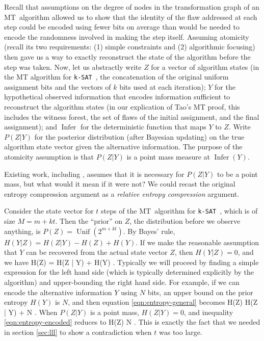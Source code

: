 \documentclass{article}
\newcommand{\ksat}{\texttt{k-SAT}~}
\newcommand{\mt}{MT~}
\def\seqn#1\eeqn{\begin{align}#1\end{align}}
\begin{document}
Recall that assumptions on the degree of nodes in the transformation graph of an \mt algorithm allowed us to show that the identity of the flaw addressed at each step could be encoded using fewer bits on average than would be needed to encode the randomness involved in making the step itself.  Assuming atomicity (recall its two requirements: (1) simple constraints and (2) algorithmic focusing) then gave us a way to exactly reconstruct the state of the algorithm before the step was taken.  Now, let us abstractly write $Z$ for a vector of algorithm states (in the MT algorithm for \ksat, the concatenation of the original uniform assignment bits and the vectors of $k$ bits used at each iteration); $Y$ for the hypothetical observed information that encodes information sufficient to reconstruct the algorithm states (in our explication of Tao's MT proof, this includes the witness forest, the set of flaws of the initial assignment, and the final assignment); and $\operatorname{Infer}$ for the deterministic function that maps $Y$ to $Z$.  Write $P(Z | Y)$ for the posterior distribution (after Bayesian updating) on the true algorithm state vector given the alternative information.  The purpose of the atomicity assumption is that $P(Z | Y)$ is a point mass measure at $\operatorname{Infer}(Y)$.

Existing work, including \cite{achlioptas2014random}, assumes that it is necessary for $P(Z | Y)$ to be a point mass, but what would it mean if it were not?  We could recast the original entropy compression argument as a \emph{relative entropy compression} argument.

Consider the state vector for $t$ steps of the \mt algorithm for \ksat, which is of size $M = m + kt$.  Then the ``prior'' on $Z$, the distribution before we observe anything, is $P(Z) = \operatorname{Unif}(2^{m+kt})$.  By Bayes' rule, $H(Y | Z) = H(Z | Y) - H(Z) + H(Y)$.  If we make the reasonable assumption that $Y$ can be recovered from the actual state vector $Z$, then $H(Y | Z) = 0$, and we have
\seqn
  \label{eqn:entropy-general}
  H(Z) = H(Z | Y) + H(Y) .
\eeqn
Typically we will proceed by finding a simple expression for the left hand side (which is typically determined explicitly by the algorithm) and upper-bounding the right hand side.  For example, if we can encode the alternative information $Y$ using $N$ bits, an upper bound on the prior entropy $H(Y)$ is $N$, and then equation \ref{eqn:entropy-general} becomes
\seqn
  \label{eqn:entropy-encoded}
  H(Z) \leq H(Z | Y) + N .
\eeqn
When $P(Z | Y)$ is a point mass, $H(Z | Y) = 0$, and inequality \ref{eqn:entropy-encoded} reduces to
\seqn
  \label{eqn:entropy-tao}
  H(Z) \leq N .
\eeqn
This is exactly the fact that we needed in section \ref{sec:lll} to show a contradiction when $t$ was too large.
\end{document}
